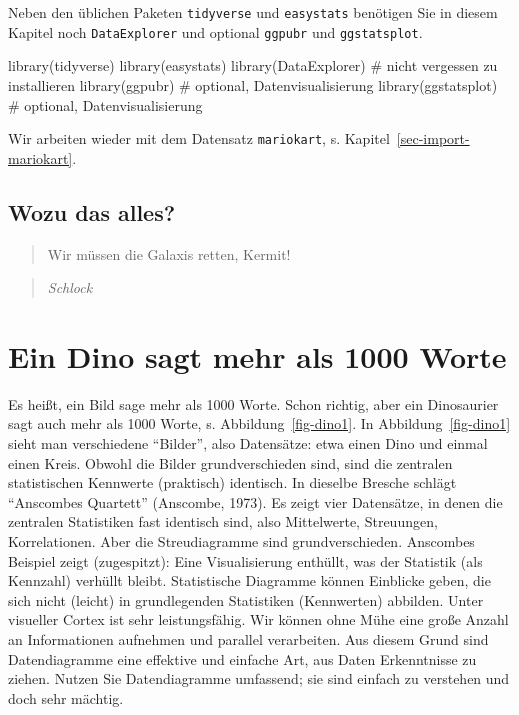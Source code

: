 \documentclass[
  letterpaper,
  twoside,
  open=any]{scrbook}
\newenvironment{Shaded}{\begin{snugshade}}{\end{snugshade}}
\newcommand{\CommentTok}[1]{\textcolor[rgb]{0.37,0.37,0.37}{#1}}
\newcommand{\FunctionTok}[1]{\textcolor[rgb]{0.28,0.35,0.67}{#1}}
\newcommand{\NormalTok}[1]{\textcolor[rgb]{0.00,0.23,0.31}{#1}}
\theoremstyle{definition}
\theoremstyle{definition}
\theoremstyle{definition}
\theoremstyle{remark}
\begin{document}
Neben den üblichen Paketen \texttt{tidyverse} und \texttt{easystats}
benötigen Sie in diesem Kapitel noch \texttt{DataExplorer} und optional
\texttt{ggpubr} und \texttt{ggstatsplot}.

\begin{Shaded}
\begin{Highlighting}[]
\FunctionTok{library}\NormalTok{(tidyverse)}
\FunctionTok{library}\NormalTok{(easystats)}
\FunctionTok{library}\NormalTok{(DataExplorer)  }\CommentTok{\# nicht vergessen zu installieren}
\FunctionTok{library}\NormalTok{(ggpubr)  }\CommentTok{\# optional, Datenvisualisierung}
\FunctionTok{library}\NormalTok{(ggstatsplot)  }\CommentTok{\# optional, Datenvisualisierung}
\end{Highlighting}
\end{Shaded}

Wir arbeiten wieder mit dem Datensatz \texttt{mariokart}, s.
Kapitel~\ref{sec-import-mariokart}.

\subsection{Wozu das alles?}\label{wozu-das-alles}

\begin{quote}
{} Wir müssen die Galaxis retten, Kermit!
\end{quote}

\begin{quote}
{} \emph{Schlock}
\end{quote}

\section{Ein Dino sagt mehr als 1000
Worte}\label{ein-dino-sagt-mehr-als-1000-worte}

Es heißt, ein Bild sage mehr als 1000 Worte. Schon richtig, aber ein
Dinosaurier sagt auch mehr als 1000 Worte, s. Abbildung~\ref{fig-dino1}.
In Abbildung~\ref{fig-dino1} sieht man verschiedene \enquote{Bilder},
also Datensätze: etwa einen Dino und einmal einen Kreis. Obwohl die
Bilder grundverschieden sind, sind die zentralen statistischen Kennwerte
(praktisch) identisch. In dieselbe Bresche schlägt \enquote{Anscombes
Quartett} (Anscombe, 1973). Es zeigt vier Datensätze, in denen die
zentralen Statistiken fast identisch sind, also Mittelwerte, Streuungen,
Korrelationen. Aber die Streudiagramme sind grundverschieden. Anscombes
Beispiel zeigt (zugespitzt): Eine Visualisierung enthüllt, was der
Statistik (als Kennzahl) verhüllt bleibt. Statistische Diagramme können
Einblicke geben, die sich nicht (leicht) in grundlegenden Statistiken
(Kennwerten) abbilden. Unter visueller Cortex ist sehr leistungsfähig.
Wir können ohne Mühe eine große Anzahl an Informationen aufnehmen und
parallel verarbeiten. Aus diesem Grund sind Datendiagramme eine
effektive und einfache Art, aus Daten Erkenntnisse zu ziehen. Nutzen Sie
Datendiagramme umfassend; sie sind einfach zu verstehen und doch sehr
mächtig.
\end{document}
